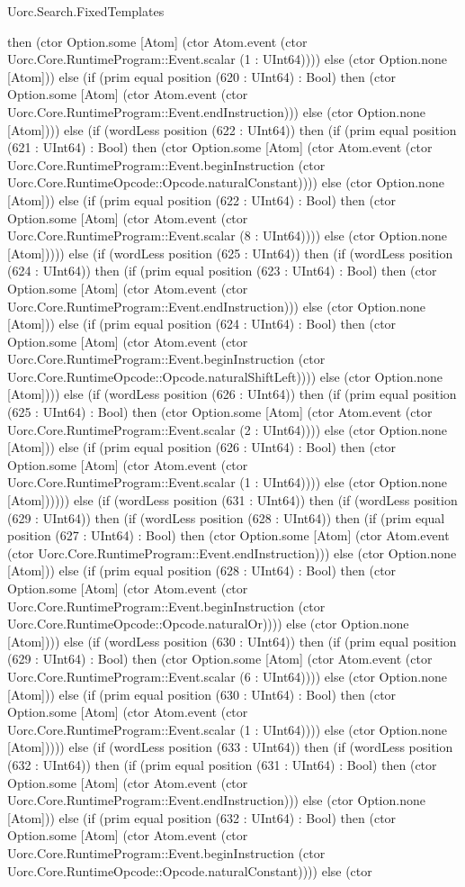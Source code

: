 \begin{lexlean}{Uorc.Search.FixedTemplates}
\begin{semanticmodule}
{then (ctor Option.some [Atom] (ctor Atom.event (ctor Uorc.Core.RuntimeProgram::Event.scalar (1 : UInt64)))) else (ctor Option.none [Atom])) else (if (prim equal position (620 : UInt64) : Bool) then (ctor Option.some [Atom] (ctor Atom.event (ctor Uorc.Core.RuntimeProgram::Event.endInstruction))) else (ctor Option.none [Atom]))) else (if (wordLess position (622 : UInt64)) then (if (prim equal position (621 : UInt64) : Bool) then (ctor Option.some [Atom] (ctor Atom.event (ctor Uorc.Core.RuntimeProgram::Event.beginInstruction (ctor Uorc.Core.RuntimeOpcode::Opcode.naturalConstant)))) else (ctor Option.none [Atom])) else (if (prim equal position (622 : UInt64) : Bool) then (ctor Option.some [Atom] (ctor Atom.event (ctor Uorc.Core.RuntimeProgram::Event.scalar (8 : UInt64)))) else (ctor Option.none [Atom])))) else (if (wordLess position (625 : UInt64)) then (if (wordLess position (624 : UInt64)) then (if (prim equal position (623 : UInt64) : Bool) then (ctor Option.some [Atom] (ctor Atom.event (ctor Uorc.Core.RuntimeProgram::Event.endInstruction))) else (ctor Option.none [Atom])) else (if (prim equal position (624 : UInt64) : Bool) then (ctor Option.some [Atom] (ctor Atom.event (ctor Uorc.Core.RuntimeProgram::Event.beginInstruction (ctor Uorc.Core.RuntimeOpcode::Opcode.naturalShiftLeft)))) else (ctor Option.none [Atom]))) else (if (wordLess position (626 : UInt64)) then (if (prim equal position (625 : UInt64) : Bool) then (ctor Option.some [Atom] (ctor Atom.event (ctor Uorc.Core.RuntimeProgram::Event.scalar (2 : UInt64)))) else (ctor Option.none [Atom])) else (if (prim equal position (626 : UInt64) : Bool) then (ctor Option.some [Atom] (ctor Atom.event (ctor Uorc.Core.RuntimeProgram::Event.scalar (1 : UInt64)))) else (ctor Option.none [Atom]))))) else (if (wordLess position (631 : UInt64)) then (if (wordLess position (629 : UInt64)) then (if (wordLess position (628 : UInt64)) then (if (prim equal position (627 : UInt64) : Bool) then (ctor Option.some [Atom] (ctor Atom.event (ctor Uorc.Core.RuntimeProgram::Event.endInstruction))) else (ctor Option.none [Atom])) else (if (prim equal position (628 : UInt64) : Bool) then (ctor Option.some [Atom] (ctor Atom.event (ctor Uorc.Core.RuntimeProgram::Event.beginInstruction (ctor Uorc.Core.RuntimeOpcode::Opcode.naturalOr)))) else (ctor Option.none [Atom]))) else (if (wordLess position (630 : UInt64)) then (if (prim equal position (629 : UInt64) : Bool) then (ctor Option.some [Atom] (ctor Atom.event (ctor Uorc.Core.RuntimeProgram::Event.scalar (6 : UInt64)))) else (ctor Option.none [Atom])) else (if (prim equal position (630 : UInt64) : Bool) then (ctor Option.some [Atom] (ctor Atom.event (ctor Uorc.Core.RuntimeProgram::Event.scalar (1 : UInt64)))) else (ctor Option.none [Atom])))) else (if (wordLess position (633 : UInt64)) then (if (wordLess position (632 : UInt64)) then (if (prim equal position (631 : UInt64) : Bool) then (ctor Option.some [Atom] (ctor Atom.event (ctor Uorc.Core.RuntimeProgram::Event.endInstruction))) else (ctor Option.none [Atom])) else (if (prim equal position (632 : UInt64) : Bool) then (ctor Option.some [Atom] (ctor Atom.event (ctor Uorc.Core.RuntimeProgram::Event.beginInstruction (ctor Uorc.Core.RuntimeOpcode::Opcode.naturalConstant)))) else (ctor }
\end{semanticmodule}
\end{lexlean}
